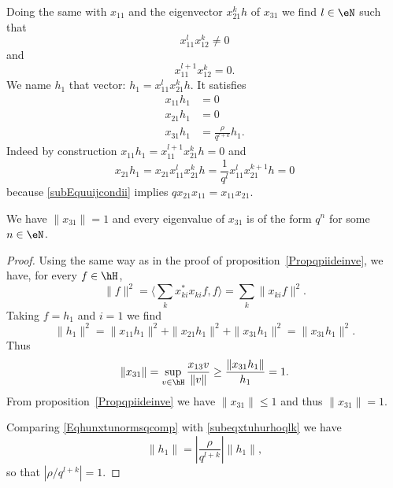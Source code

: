 Doing the same with \( x_{11}\) and the eigenvector \( x_{21}^kh\) of \( x_{31}\) we find \( l\in\eN\) such that
\begin{equation}
	x_{11}^lx_{12}^k\neq 0
\end{equation}
and
\begin{equation}
	x_{11}^{l+1}x_{12}^k=0.
\end{equation}
We name \( h_1\) that vector: $h_1=x_{11}^lx_{21}^kh$. It satisfies
\begin{subequations}
	\begin{align}
		x_{11}h_1 & =0                                                          \\
		x_{21}h_1 & =0                                                          \\
		x_{31}h_1 & =\frac{ \rho }{ q^{l+k} }h_1      \label{subeqxtuhurhoqlk}.
	\end{align}
\end{subequations}
Indeed by construction \( x_{11}h_1=x_{11}^{l+1}x_{21}^kh=0\) and
\begin{equation}
	x_{21}h_1=x_{21}x_{11}^{l}x_{21}^kh=\frac{1}{ q^l }x_{11}^lx_{21}^{k+1}h=0
\end{equation}
because \eqref{subEquuijcondii} implies \( qx_{21}x_{11}=x_{11}x_{21}\).

\begin{proposition}
	We have \( \| x_{31} \|=1\) and every eigenvalue of \( x_{31}\) is of the form \( q^n\) for some \( n\in\eN\).
\end{proposition}

\begin{proof}
	Using the same way as in the proof of proposition~\ref{Propqpiideinve}, we have, for every \( f\in\hH\),
	\begin{equation}
		\| f \|^2=\langle \sum_kx_{ki}^*x_{ki}f, f\rangle=\sum_k\| x_{ki}f \|^2.
	\end{equation}
	Taking \( f=h_1\) and \( i=1\) we find
	\begin{equation}    \label{Eqhunxtunormsqcomp}
		\| h_1 \|^2=\| x_{11}h_1 \|^2+\| x_{21}h_1 \|^2+\| x_{31}h_1 \|^2=\| x_{31}h_1 \|^2.
	\end{equation}
	Thus
	\begin{equation}
		\| x_{31} \|=\sup_{v\in\hH}\frac{ x_{13}v }{ \| v \| }\geq\frac{ \| x_{31}h_1 \| }{ h_1 }=1.
	\end{equation}
	From proposition~\ref{Propqpiideinve} we have \( \| x_{31} \|\leq 1\) and thus \( \| x_{31} \|=1\).

	Comparing \eqref{Eqhunxtunormsqcomp} with \eqref{subeqxtuhurhoqlk} we have
	\begin{equation}
		\| h_1 \|=\left| \frac{ \rho }{ q^{l+k} } \right| \| h_1 \|,
	\end{equation}
	so that \( | \rho/q^{l+k} |=1\).
\end{proof}

